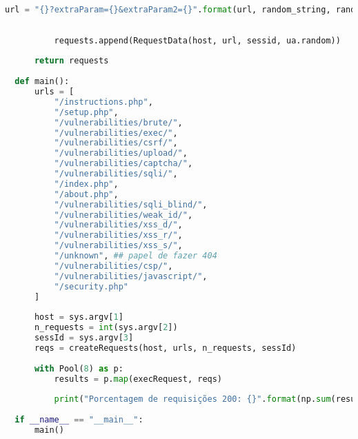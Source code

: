 \begin{lstlisting}[language=Python]
              url = "{}?extraParam={}&extraParam2={}".format(url, random_string, random_string2)
  
          
          requests.append(RequestData(host, url, sessid, ua.random))
  
      return requests
  
  def main():
      urls = [
          "/instructions.php",
          "/setup.php",
          "/vulnerabilities/brute/",
          "/vulnerabilities/exec/",
          "/vulnerabilities/csrf/",
          "/vulnerabilities/upload/",
          "/vulnerabilities/captcha/",
          "/vulnerabilities/sqli/",
          "/index.php",
          "/about.php",
          "/vulnerabilities/sqli_blind/",
          "/vulnerabilities/weak_id/",
          "/vulnerabilities/xss_d/",
          "/vulnerabilities/xss_r/",
          "/vulnerabilities/xss_s/",
          "/unknown", ## papel de fazer 404
          "/vulnerabilities/csp/",
          "/vulnerabilities/javascript/",
          "/security.php"
      ]
  
      host = sys.argv[1]
      n_requests = int(sys.argv[2])
      sessId = sys.argv[3]
      reqs = createRequests(host, urls, n_requests, sessId)
  
      with Pool(8) as p:
          results = p.map(execRequest, reqs)
  
          print("Porcentagem de requisições 200: {}".format(np.sum(results)/n_requests))
  
  if __name__ == "__main__":
      main()
\end{lstlisting}